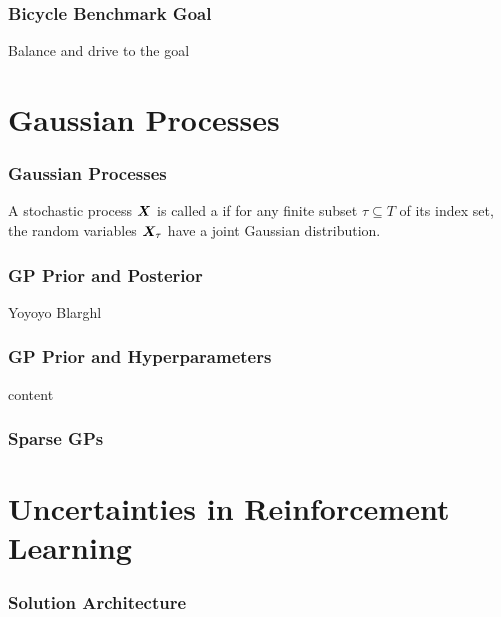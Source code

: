 \begin{frame}
    \frametitle{Bicycle Benchmark Goal}

    Balance and drive to the goal
\end{frame}

\section{Gaussian Processes}
\begin{frame}
    \frametitle{Gaussian Processes}

    \begin{definition}
        A stochastic process $\bm{X}$ is called a  if for any finite subset $\tau \subseteq T$ of its index set, the random variables $\bm{X}_\tau$ have a joint Gaussian distribution.
    \end{definition}
\end{frame}

\begin{frame}
    \frametitle{GP Prior and Posterior}

    \begin{block}{Yoyoyo}
        Blarghl
    \end{block}
    \vfill
    \centering
\end{frame}

\begin{frame}
    \frametitle{GP Prior and Hyperparameters}

    content
\end{frame}

\begin{frame}
    \frametitle{Sparse GPs}

    \centering
\end{frame}

\section{Uncertainties in Reinforcement Learning}
\begin{frame}[label=architecture]
    \frametitle{Solution Architecture}

    \centering
    
\end{frame}

